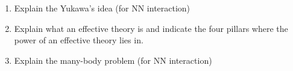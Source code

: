 \begin{enumerate}
    \item Explain the Yukawa's idea (for NN interaction)
    \item Explain what an effective theory is and indicate the four pillars where the power of an effective theory lies in.
    \item Explain the many-body problem (for NN interaction)
\end{enumerate}

